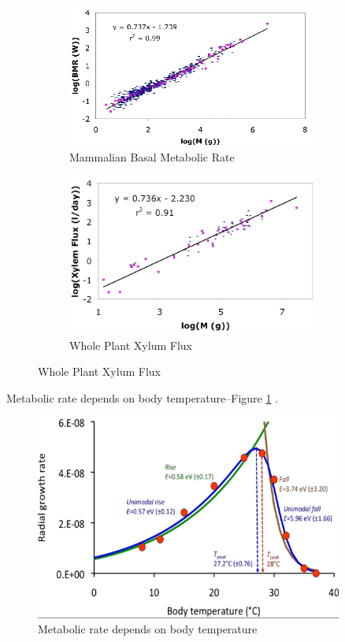 \documentclass[]{article}
\begin{document}
\begin{figure}[H]
	\caption{Metabolic rate depends on optimized networks and body size}\label{fig:MammalianBasalMetabolicRate}
	\begin{subfigure}[p]{0.45\textwidth}
		\caption{Mammalian Basal Metabolic Rate}
		\includegraphics[width=0.9\textwidth]{MammalianBasalMetabolicRate}
	\end{subfigure}
	\begin{subfigure}[p]{0.45\textwidth}
		\caption{Whole Plant Xylum Flux}
		\includegraphics[width=0.9\textwidth]{WholePlantXylumFlux}
	\end{subfigure}
\end{figure}

Metabolic rate depends on body temperature--Figure \ref{fig:BodyTemperature} \cite{dell2011systematic}.

\begin{figure}[H]
	\caption{Metabolic rate depends on body temperature}\label{fig:BodyTemperature}
	\includegraphics[width=0.9\textwidth]{BodyTemperature}
\end{figure}
\end{document}
